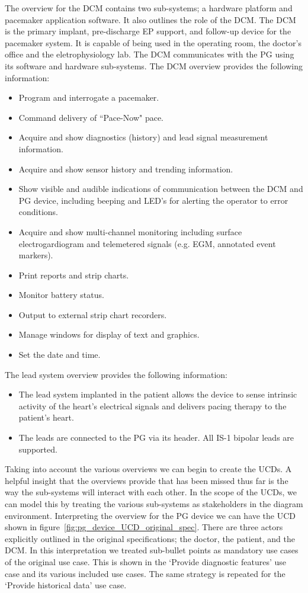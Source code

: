 The overview for the DCM contains two sub-systems; a hardware platform and pacemaker application software. It also outlines the role of the DCM. The DCM is the primary implant, pre-discharge EP support, and follow-up device for the pacemaker system. It is capable of being used in the operating room, the doctor's office and the eletrophysiology lab. The DCM communicates with the PG using its software and hardware sub-systems. The DCM overview provides the following information:
\begin{itemize}
	\item Program and interrogate a pacemaker.
	\item Command delivery of ``Pace-Now" pace.
	\item Acquire and show diagnostics (history) and lead signal measurement information.
	\item Acquire and show sensor history and trending information.
	\item Show visible and audible indications of communication between the DCM and PG device, including beeping and LED's for alerting the operator to error conditions.
	\item Acquire and show multi-channel monitoring including surface electrogardiogram and telemetered signals (e.g. EGM, annotated event markers).
	\item Print reports and strip charts.
	\item Monitor battery status.
	\item Output to external strip chart recorders.
	\item Manage windows for display of text and graphics.
	\item Set the date and time.
\end{itemize}

The lead system overview provides the following information:
\begin{itemize}
	\item The lead system implanted in the patient allows the device to sense intrinsic activity of the heart's electrical signals and delivers pacing therapy to the patient's heart.
	\item The leads are connected to the PG via its header. All IS-1 bipolar leads are supported.
\end{itemize}

Taking into account the various overviews we can begin to create the UCDs. A helpful insight that the overviews provide that has been missed thus far is the way the sub-systems will interact with each other. In the scope of the UCDs, we can model this by treating the various sub-systems as stakeholders in the diagram environment. Interpreting the overview for the PG device we can have the UCD shown in figure~\ref{fig:pg_device_UCD_original_spec}. There are three actors explicitly outlined in the original specifications; the doctor, the patient, and the DCM. In this interpretation we treated sub-bullet points as mandatory use cases of the original use case. This is shown in the `Provide diagnostic features' use case and its various included use cases. The same strategy is repeated for the `Provide historical data' use case.

